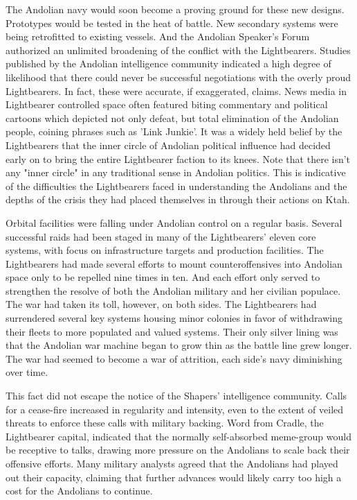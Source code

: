 \begin{itemize}
The Andolian navy would soon become a proving ground for these new
designs.  Prototypes would be tested in the heat of battle.  New
secondary systems were being retrofitted to existing vessels.  And the
Andolian Speaker's Forum authorized an unlimited broadening of the
conflict with the Lightbearers.  Studies published by the Andolian
intelligence community indicated a high degree of likelihood that
there could never be successful negotiations with the overly proud
Lightbearers.  In fact, these were accurate, if exaggerated, claims.
News media in Lightbearer controlled space often featured biting
commentary and political cartoons which depicted not only defeat, but
total elimination of the Andolian people, coining phrases such as
'Link Junkie'.  It was a widely held belief by the Lightbearers that
the inner circle of Andolian political influence had decided early on
to bring the entire Lightbearer faction to its knees. Note that there
isn't any "inner circle" in any traditional sense in Andolian
politics. This is indicative of the difficulties the Lightbearers
faced in understanding the Andolians and the depths of the crisis they
had placed themselves in through their actions on Ktah.

Orbital facilities were falling under Andolian control on a regular
basis.  Several successful raids had been staged in many of the
Lightbearers' eleven core systems, with focus on infrastructure
targets and production facilities.  The Lightbearers had made several
efforts to mount counteroffensives into Andolian space only to be
repelled nine times in ten.  And each effort only served to strengthen
the resolve of both the Andolian military and her civilian populace.
The war had taken its toll, however, on both sides.  The Lightbearers
had surrendered several key systems housing minor colonies in favor of
withdrawing their fleets to more populated and valued systems. Their
only silver lining was that the Andolian war machine began to grow
thin as the battle line grew longer.  The war had seemed to become a
war of attrition, each side's navy diminishing over time.

This fact did not escape the notice of the Shapers' intelligence
community.  Calls for a cease-fire increased in regularity and
intensity, even to the extent of veiled threats to enforce these calls
with military backing.  Word from Cradle, the Lightbearer capital,
indicated that the normally self-absorbed meme-group would be
receptive to talks, drawing more pressure on the Andolians to scale
back their offensive efforts.  Many military analysts agreed that the
Andolians had played out their capacity, claiming that further
advances would likely carry too high a cost for the Andolians to
continue.
	

\end{itemize}
